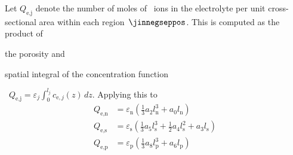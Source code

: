 Let  $Q_\text{e,j}$  denote  the  number  of moles  of  ~ions  in  the
electrolyte per  unit cross-sectional  area within each  region~$\jinnegseppos$.
This is  computed as  the product  of
\begin{enumerate*}[label=\emph{\alph*})]
    \item the porosity and
    \item spatial integral of the concentration function
\end{enumerate*}
\ie~${ Q_\text{e,j}  =  \varepsilon_j \int_0^{l_j}  c_{\text{e},j}(z) \,dz  }$.
Applying this to 
\begin{align}
    Q_\text{e,n} &= \varepsilon_\text{n} \left( \frac{1}{3} a_2 l^3_\text{n} + a_0 l_\text{n}\right)\label{eq:Qenbyintegration}\\
    Q_\text{e,s} &= \varepsilon_\text{s} \left( \frac{1}{3} a_5 l^3_\text{s} + \frac{1}{2} a_4 l^2_\text{s} + a_3 l_\text{s}\right)\\
    Q_\text{e,p} &= \varepsilon_\text{p} \left( \frac{1}{3} a_8 l^3_\text{p} + a_6 l_\text{p}\right) \label{eq:Qepbyintegration}
\end{align}


